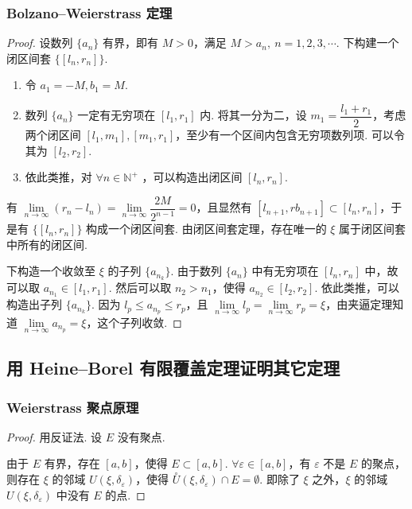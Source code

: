 \documentclass[zihao=-4,linespread=1.8,UTF8,nothm]{aytony_base}
\theoremstyle{definition}
\begin{document}
\begin{appendices}
    \subsubsection{Bolzano--Weierstrass 定理}

    \begin{proof}
        设数列 $\{a_n\}$ 有界，即有 $M > 0$，满足 $M > a_n,\ n = 1, 2, 3, \cdots$. 下构建一个闭区间套 $\{[l_n, r_n]\}$.

        \begin{enumerate}
            \item 令 $a_1 = -M, b_1 = M$.
            \item 数列 $\{a_n\}$ 一定有无穷项在 $[l_1, r_1]$ 内. 将其一分为二，设 $m_1 = \dfrac{l_1+r_1}{2}$，考虑两个闭区间 $[l_1, m_1], [m_1, r_1]$，至少有一个区间内包含无穷项数列项. 可以令其为 $[l_2, r_2]$.
            \item 依此类推，对 $\forall n \in \mathbb{N}^+$ ，可以构造出闭区间 $[l_n, r_n]$.
        \end{enumerate}

        有 $\lim\limits_{n \to \infty} (r_n - l_n) = \lim\limits_{n \to \infty} \dfrac{2M}{2^{n-1}} = 0$，且显然有 $[l_{n+1}, rb_{n+1}] \subset [l_n, r_n]$，于是有 $\{[l_n, r_n]\}$ 构成一个闭区间套. 由闭区间套定理，存在唯一的 $\xi$ 属于闭区间套中所有的闭区间.

        下构造一个收敛至 $\xi$ 的子列 $\{a_{n_k}\}$. 由于数列 $\{a_n\}$ 中有无穷项在 $[l_n, r_n]$ 中，故可以取 $a_{n_1} \in [l_1, r_1]$. 然后可以取 $n_2 > n_1$，使得 $a_{n_2} \in [l_2, r_2]$. 依此类推，可以构造出子列 $\{a_{n_k}\}$. 因为 $l_p \leqslant a_{n_p} \leqslant r_p$，且 $\lim\limits_{n \to \infty} l_p = \lim\limits_{n \to \infty} r_p = \xi$，由夹逼定理知道 $\lim\limits_{n \to \infty} a_{n_p} = \xi$，这个子列收敛.
    \end{proof}


    \subsection{用 Heine--Borel 有限覆盖定理证明其它定理}

    \subsubsection{Weierstrass 聚点原理}
    \begin{proof}
        用反证法. 设 $E$ 没有聚点.

        由于 $E$ 有界，存在 $[a, b]$，使得 $E \subset [a, b]$. $\forall \varepsilon \in [a, b]$，有 $\varepsilon$ 不是 $E$ 的聚点，则存在 $\xi$ 的邻域 $U(\xi, \delta_\varepsilon)$，使得 $\overset{\circ}{U}(\xi, \delta_\varepsilon) \cap E = \emptyset$. 即除了 $\xi$ 之外，$\xi$ 的邻域 $U(\xi, \delta_\varepsilon)$ 中没有 $E$ 的点.


\end{proof}
\end{appendices}
\end{document}

